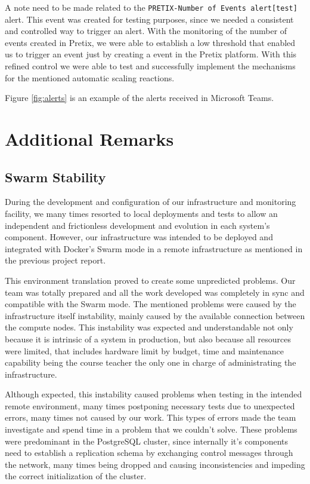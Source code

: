 \documentclass[12pt]{article}
\begin{document}
A note need to be made related to the \texttt{PRETIX-Number of Events alert[test]} alert. This event was created for testing purposes, since we needed a consistent and controlled way to trigger an alert. With the monitoring of the number of events created in Pretix, we were able to establish a low threshold that enabled us to trigger an event just by creating a event in the Pretix platform. With this refined control we were able to test and successfully implement the mechanisms for the mentioned automatic scaling reactions.

Figure \ref{fig:alerts} is an example of the alerts received in Microsoft Teams.

\section{Additional Remarks} \label{remarks} %

\subsection{Swarm Stability} \label{remarks.stability} %

During the development and configuration of our infrastructure and monitoring facility, we many times resorted to local deployments and tests to allow an independent and frictionless development and evolution in each system's component. However, our infrastructure was intended to be deployed and integrated with Docker's Swarm mode in a remote infrastructure as mentioned in the previous project report.

This environment translation proved to create some unpredicted problems. Our team was totally prepared and all the work developed was completely in sync and compatible with the Swarm mode. The mentioned problems were caused by the infrastructure itself instability, mainly caused by the available connection between the compute nodes. This instability was expected and understandable not only because it is intrinsic of a system in production, but also because all resources were limited, that includes hardware limit by budget, time and maintenance capability being the course teacher the only one in charge of administrating the infrastructure.

Although expected, this instability caused problems when testing in the intended remote environment, many times postponing necessary tests due to unexpected errors, many times not caused by our work. This types of errors made the team investigate and spend time in a problem that we couldn't solve. These problems were predominant in the PostgreSQL cluster, since internally it's components need to establish a replication schema by exchanging control messages through the network, many times being dropped and causing inconsistencies and impeding the correct initialization of the cluster.
\end{document}

